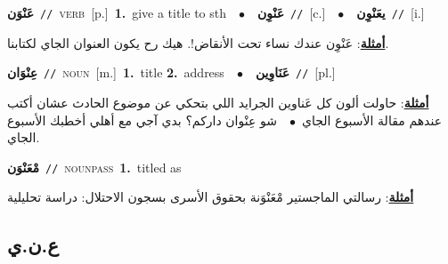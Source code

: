 \documentclass[10pt,a4paper,twoside]{article} %
\begin{document}
\begin{multicols}{2}
{\setlength\topsep{0pt}\textbf{\foreignlanguage{arabic}{عَنْوَن}}\ {\color{gray}\texttt{//}\color{black}}\ \textsc{verb}\ [p.]\ \textbf{1.}~give a title to sth\ \ $\bullet$\ \ \setlength\topsep{0pt}\textbf{\foreignlanguage{arabic}{عَنْوِن}}\ {\color{gray}\texttt{//}\color{black}}\ [c.]\ \ $\bullet$\ \ \setlength\topsep{0pt}\textbf{\foreignlanguage{arabic}{يعَنْوِن}}\ {\color{gray}\texttt{//}\color{black}}\ [i.]\  \begin{flushright}\color{gray}\foreignlanguage{arabic}{\textbf{\underline{\foreignlanguage{arabic}{أمثلة}}}: عَنْوِن عندك نساء تحت الأنقاض!. هيك رح يكون العنوان الجاي لكتابنا.}\end{flushright}\color{black}} \vspace{2mm}

{\setlength\topsep{0pt}\textbf{\foreignlanguage{arabic}{عِنْوَان}}\ {\color{gray}\texttt{//}\color{black}}\ \textsc{noun}\ [m.]\ \textbf{1.}~title  \textbf{2.}~address\ \ $\bullet$\ \ \setlength\topsep{0pt}\textbf{\foreignlanguage{arabic}{عَنَاوِين}}\ {\color{gray}\texttt{//}\color{black}}\ [pl.]\  \begin{flushright}\color{gray}\foreignlanguage{arabic}{\textbf{\underline{\foreignlanguage{arabic}{أمثلة}}}: حاولت ألون كل عَناوين الجرايد اللي بتحكي عن موضوع الحادث عشان أكتب عندهم مقالة الأسبوع الجاي\ $\bullet$\ \  شو عِنْوان داركم؟ بدي آجي مع أهلي أخطبك الأسبوع الجاي.}\end{flushright}\color{black}} \vspace{2mm}

{\setlength\topsep{0pt}\textbf{\foreignlanguage{arabic}{مْعَنْوَن}}\ {\color{gray}\texttt{//}\color{black}}\ \textsc{noun\textunderscore pass}\ \textbf{1.}~titled as\  \begin{flushright}\color{gray}\foreignlanguage{arabic}{\textbf{\underline{\foreignlanguage{arabic}{أمثلة}}}: رسالتي الماجستير مْعَنْوَنة بحقوق الأسرى بسجون الاحتلال: دراسة تحليلية}\end{flushright}\color{black}} \vspace{2mm}

\vspace{-3mm}
\subsection*{\color{blue}\foreignlanguage{arabic}{ع.ن.ي}\color{blue}{}} 


\end{multicols}
\end{document}
